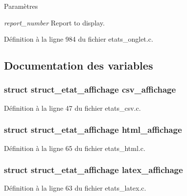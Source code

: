 \begin{DoxyParams}{Paramètres}
\item[{\em report\_\-number}]Report to display. \end{DoxyParams}


Définition à la ligne 984 du fichier etats\_\-onglet.c.



\subsection{Documentation des variables}
\subsubsection[{csv\_\-affichage}]{\setlength{\rightskip}{0pt plus 5cm}struct {\bf struct\_\-etat\_\-affichage} {\bf csv\_\-affichage}}\label{etats__onglet_8c_a121b891fb05ffbd94cb74962dd89abd9}


Définition à la ligne 47 du fichier etats\_\-csv.c.

\subsubsection[{html\_\-affichage}]{\setlength{\rightskip}{0pt plus 5cm}struct {\bf struct\_\-etat\_\-affichage} {\bf html\_\-affichage}}\label{etats__onglet_8c_a82e802227c548b6c4ff47ca8b6c4958b}


Définition à la ligne 65 du fichier etats\_\-html.c.

\subsubsection[{latex\_\-affichage}]{\setlength{\rightskip}{0pt plus 5cm}struct {\bf struct\_\-etat\_\-affichage} {\bf latex\_\-affichage}}\label{etats__onglet_8c_aa79551ad1b2719219e91f89607c560d8}


Définition à la ligne 63 du fichier etats\_\-latex.c.

